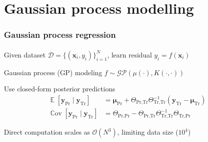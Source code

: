 \documentclass{beamer}                             %
\newcommand*{\BigO}{\mathcal{O}}
\newcommand*{\GP}{\mathcal{GP}}
\renewcommand*{\vec}[1]{\bm{#1}}
\newcommand*{\CM}{\Theta}
\newcommand*{\mean}{\mu}
\newcommand*{\K}{K}
\newcommand*{\Train}{\text{Tr}}
\newcommand*{\Pred}{\text{Pr}}
\DeclareMathOperator{\E}{\mathbb{E}}
\DeclareMathOperator{\Cov}{\mathbb{C}ov}
\newenvironment{wideitemize}
  {\itemize\setlength{\itemsep}{0.5cm}}
  {\enditemize}
\begin{document}
\section{Gaussian process modelling}

\begin{frame}
\frametitle{Gaussian process regression}
\framesubtitle{}

\begin{wideitemize}
  \item<+-> Given dataset \( \mathcal{D} = \{ (\vec{x}_i, y_i)
    \}_{i = 1}^N \), learn residual \( y_i = f(\vec{x}_i) \)
  \item<+-> Gaussian process (GP) modeling
    \( f \sim \GP(\mu(\cdot), \K(\cdot, \cdot)) \)
  \item<+-> Use closed-form posterior predictions
    \begin{align*}
      \E[\vec{y}_\Pred \mid \vec{y}_\Train] &=
        \vec{\mean}_\Pred +
        \CM_{\Pred, \Train} \CM_{\Train, \Train}^{-1}
        (\vec{y}_\Train - \vec{\mean}_\Train) \\
      \Cov[\vec{y}_\Pred \mid \vec{y}_\Train] &=
        \CM_{\Pred, \Pred} -
        \CM_{\Pred, \Train} \CM_{\Train, \Train}^{-1}
        \CM_{\Train, \Pred}
    \end{align*}
    \item<+-> Direct computation scales as \(
      \BigO(N^3) \), limiting data size (\( 10^4 \))
  \end{wideitemize}
\end{frame}
\end{document}
